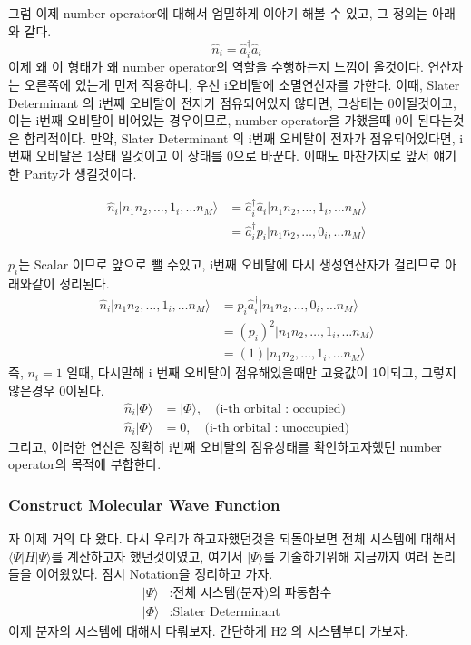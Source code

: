 \documentclass[10pt]{article}
\begin{document}
그럼 이제 number operator에 대해서 엄밀하게 이야기 해볼 수 있고, 그 정의는 아래와 같다. 
\[
\hat{n}_i = \hat{a}_i^{\dagger}\hat{a}_i
\]
이제 왜 이 형태가 왜 number operator의 역할을 수행하는지 느낌이 올것이다. 
연산자는 오른쪽에 있는게 먼저 작용하니, 우선 i오비탈에 소멸연산자를 가한다. 이때, Slater Determinant 의 i번째 오비탈이 전자가 점유되어있지 않다면, 그상태는 0이될것이고, 
이는 i번째 오비탈이 비어있는 경우이므로, number operator을 가했을때 0이 된다는것은 합리적이다. 
만약, Slater Determinant 의 i번째 오비탈이 전자가 점유되어있다면, i번째 오비탈은 1상태 일것이고 이 상태를 0으로 바꾼다. 
이때도 마찬가지로 앞서 얘기한 Parity가 생길것이다.

\begin{align*}
\hat{n}_i\vert n_1 n_2 ,\dots, 1_i ,\dots n_M \rangle &=\hat{a}_i^{\dagger}\hat{a}_i \vert n_1 n_2 ,\dots, 1_i ,\dots n_M \rangle \\
&= \hat{a}_i^{\dagger} p_i \vert n_1 n_2 ,\dots, 0_i ,\dots n_M \rangle
\end{align*}

\(p_i\)는 Scalar 이므로 앞으로 뺄 수있고, i번째 오비탈에 다시 생성연산자가 걸리므로 아래와같이 정리된다. 
\begin{align*}
\hat{n}_i\vert n_1 n_2 ,\dots, 1_i ,\dots n_M \rangle &=p_i \hat{a}_i^{\dagger}  \vert n_1 n_2 ,\dots, 0_i ,\dots n_M \rangle \\
&= (p_i)^2 \vert n_1 n_2 ,\dots, 1_i ,\dots n_M \rangle \\
&= (1) \vert n_1 n_2 ,\dots, 1_i ,\dots n_M \rangle
\end{align*}
즉, \(n_i = 1\) 일때, 다시말해 i 번째 오비탈이 점유해있을때만 고윳값이 1이되고, 그렇지 않은경우 0이된다. 
\begin{align*}
\hat{n}_i \vert \Phi \rangle &= \vert \Phi \rangle , \quad \text{(i-th orbital : occupied)}\\
\hat{n}_i \vert \Phi \rangle &= 0 , \quad \text{(i-th orbital : unoccupied)}
\end{align*}
그리고, 이러한 연산은 정확히 i번째 오비탈의 점유상태를 확인하고자했던 number operator의 목적에 부합한다. 


\subsubsection{Construct Molecular Wave Function}
자 이제 거의 다 왔다. 다시 우리가 하고자했던것을 되돌아보면 전체 시스템에 대해서 \(\langle \Psi|H|\Psi \rangle\)를 계산하고자 했던것이였고, 
여기서 \(|\Psi \rangle \)를 기술하기위해 지금까지 여러 논리들을 이어왔었다. 
잠시 Notation을 정리하고 가자. 
\begin{align*}
| \Psi \rangle &: \text{전체 시스템(분자)의 파동함수}\\
| \Phi \rangle &: \text{Slater Determinant}
\end{align*}
이제 분자의 시스템에 대해서 다뤄보자. 
간단하게 H2 의 시스템부터 가보자. 
\end{document}
